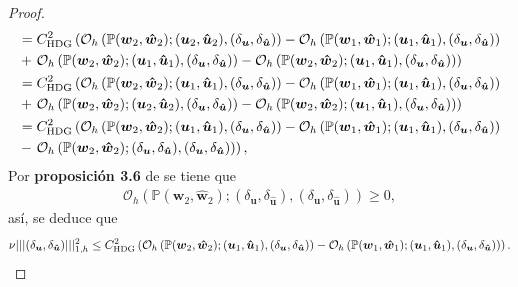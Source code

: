 \documentclass[10pt,a4paper]{report}
\newcommand{\bs}{\boldsymbol}
\begin{document}
\begin{proof}
\begin{align*}
    	&= C^{2}_{\textup{HDG}}\left(\mathcal{O}_{h}\left(\mathbb{P}(\bs{w}_{2},\bs{\hat{w}}_{2});(\bs{u}_{2},\bs{\hat{\bs{u}}}_{2}),(\delta_{\bs{u}},\delta_{\bs{\hat{u}}})\right)-\mathcal{O}_{h}\left(\mathbb{P}(\bs{w}_{1},\bs{\hat{w}}_{1});(\bs{u}_{1},\bs{\hat{\bs{u}}}_{1}),(\delta_{\bs{u}},\delta_{\bs{\hat{u}}})\right)\right.\\ &+ \left. \mathcal{O}_{h}\left(\mathbb{P}(\bs{w}_{2},\bs{\hat{w}}_{2});(\bs{u}_{1},\bs{\hat{\bs{u}}}_{1}),(\delta_{\bs{u}},\delta_{\bs{\hat{u}}})\right) - \mathcal{O}_{h}\left(\mathbb{P}(\bs{w}_{2},\bs{\hat{w}}_{2});(\bs{u}_{1},\bs{\hat{\bs{u}}}_{1}),(\delta_{\bs{u}},\delta_{\bs{\hat{u}}})\right) \right)\\
    	&= C^{2}_{\textup{HDG}}\left(\mathcal{O}_{h}\left(\mathbb{P}(\bs{w}_{2},\bs{\hat{w}}_{2});(\bs{u}_{1},\bs{\hat{\bs{u}}}_{1}),(\delta_{\bs{u}},\delta_{\bs{\hat{u}}})\right)-\mathcal{O}_{h}\left(\mathbb{P}(\bs{w}_{1},\bs{\hat{w}}_{1});(\bs{u}_{1},\bs{\hat{\bs{u}}}_{1}),(\delta_{\bs{u}},\delta_{\bs{\hat{u}}})\right)\right.\\ &+ \left. \mathcal{O}_{h}\left(\mathbb{P}(\bs{w}_{2},\bs{\hat{w}}_{2});(\bs{u}_{2},\bs{\hat{\bs{u}}}_{2}),(\delta_{\bs{u}},\delta_{\bs{\hat{u}}})\right)  - \mathcal{O}_{h}\left(\mathbb{P}(\bs{w}_{2},\bs{\hat{w}}_{2});(\bs{u}_{1},\bs{\hat{\bs{u}}}_{1}),(\delta_{\bs{u}},\delta_{\bs{\hat{u}}})\right) \right)\\
    	&= C^{2}_{\textup{HDG}}\left(\mathcal{O}_{h}\left(\mathbb{P}(\bs{w}_{2},\bs{\hat{w}}_{2});(\bs{u}_{1},\bs{\hat{\bs{u}}}_{1}),(\delta_{\bs{u}},\delta_{\bs{\hat{u}}})\right)-\mathcal{O}_{h}\left(\mathbb{P}(\bs{w}_{1},\bs{\hat{w}}_{1});(\bs{u}_{1},\bs{\hat{\bs{u}}}_{1}),(\delta_{\bs{u}},\delta_{\bs{\hat{u}}})\right)\right.\\
    	&-\left.\mathcal{O}_{h}\left(\mathbb{P}(\bs{w}_{2},\bs{\hat{w}}_{2});(\delta_{\bs{u}},\delta_{\bs{\hat{u}}}),(\delta_{\bs{u}},\delta_{\bs{\hat{u}}})\right) \right),
    \end{align*}
    Por \textbf{proposición 3.6} de \cite{CAC2017} se tiene que 
    \begin{align*}
    	\mathcal{O}_{h}\left(\mathbb{P}(\bs{w}_{2},\bs{\hat{w}}_{2});(\delta_{\bs{u}},\delta_{\bs{\hat{u}}}),(\delta_{\bs{u}},\delta_{\bs{\hat{u}}})\right)\geq 0,
    \end{align*}
    así, se deduce que
    \begin{align*}
    	\nu||| (\delta_{\bs{u}},\delta_{\bs{\hat{u}}}) |||^{2}_{1,h}  \leq C^{2}_{\textup{HDG}}\left(\mathcal{O}_{h}\left(\mathbb{P}(\bs{w}_{2},\bs{\hat{w}}_{2});(\bs{u}_{1},\bs{\hat{\bs{u}}}_{1}),(\delta_{\bs{u}},\delta_{\bs{\hat{u}}})\right)-\mathcal{O}_{h}\left(\mathbb{P}(\bs{w}_{1},\bs{\hat{w}}_{1});(\bs{u}_{1},\bs{\hat{\bs{u}}}_{1}),(\delta_{\bs{u}},\delta_{\bs{\hat{u}}})\right)\right).

\end{align*}
\end{proof}
\end{document}
